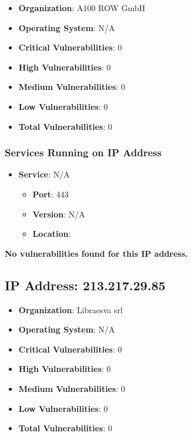 \documentclass{article}
\begin{document}
\begin{itemize}
    \item \textbf{Organization}: A100 ROW GmbH
    \item \textbf{Operating System}:  N/A 
    \item \textbf{Critical Vulnerabilities}: 0
    \item \textbf{High Vulnerabilities}: 0
    \item \textbf{Medium Vulnerabilities}: 0
    \item \textbf{Low Vulnerabilities}: 0
    \item \textbf{Total Vulnerabilities}: 0
\end{itemize}

\subsubsection*{Services Running on IP Address}

\begin{itemize}
    
        \item \textbf{Service}: N/A
        \begin{itemize}
            \item \textbf{Port}: 443
            \item \textbf{Version}:  N/A 
            \item \textbf{Location}: \href{  }{  }
        \end{itemize}
    
\end{itemize}


\textbf{No vulnerabilities found for this IP address.}




\clearpage



\subsection{IP Address: 213.217.29.85}

\begin{itemize}
    \item \textbf{Organization}: Libraesva srl
    \item \textbf{Operating System}:  N/A 
    \item \textbf{Critical Vulnerabilities}: 0
    \item \textbf{High Vulnerabilities}: 0
    \item \textbf{Medium Vulnerabilities}: 0
    \item \textbf{Low Vulnerabilities}: 0
    \item \textbf{Total Vulnerabilities}: 0
\end{itemize}
\end{document}
